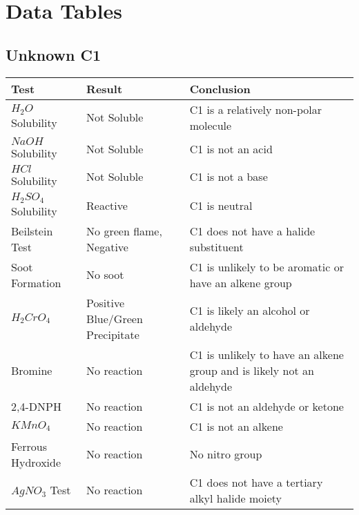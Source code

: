 \documentclass{article}
\begin{document}
	
	
	\pagebreak
	\section{Data Tables}
	\subsection{Unknown C1}
	\begin{table}[h]
		\raggedright
		\begin{tabular}{ l  p{3.0cm} p{5.4cm} } 
			\toprule
			\textbf{Test} & \textbf{Result} & \textbf{Conclusion} \\\midrule
			
			$H_2O$ Solubility & Not Soluble & C1 is a relatively non-polar molecule \\\hline
			
			$NaOH$ Solubility & Not Soluble & C1 is not an acid \\\hline
			
			$HCl$ Solubility & Not Soluble & C1 is not a base  \\\hline
			
			$H_2SO_4$ Solubility & Reactive & C1 is neutral \\\hline
			
			Beilstein Test & No green flame, Negative & C1 does not have a halide substituent \\\hline
			
			Soot Formation & No soot & C1 is unlikely to be aromatic or have an alkene group \\\hline
			
			$H_2CrO_4$ & Positive Blue/Green Precipitate & C1 is likely an alcohol or aldehyde \\\hline
			
			Bromine & No reaction & C1 is unlikely to have an alkene group and is likely not an aldehyde \\\hline 
			
			2,4-DNPH & No reaction & C1 is not an aldehyde or ketone \\\hline 
			
			$KMnO_4$ & No reaction & C1 is not an alkene \\\hline  
			
			Ferrous Hydroxide & No reaction & No nitro group \\\hline
			
			$AgNO_3$ Test & No reaction & C1 does not have a tertiary alkyl halide moiety \\\hline 
			

\end{tabular}
\end{table}
\end{document}
